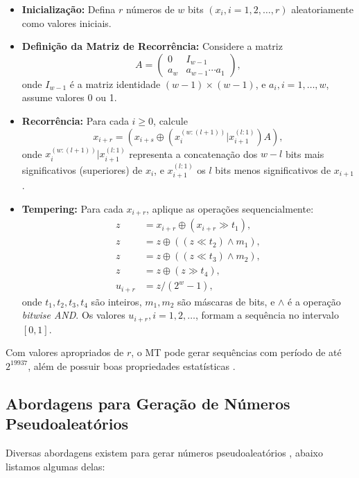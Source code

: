 \begin{itemize}
    \item \textbf{Inicialização:} Defina $r$ números de $w$ bits $(x_i, i = 1, 2, \ldots, r)$ aleatoriamente como valores iniciais.
    \item \textbf{Definição da Matriz de Recorrência:} Considere a matriz
    \[
    A = \begin{pmatrix}
    0 & I_{w-1} \\
    a_w & a_{w-1} \cdots a_1
    \end{pmatrix},
    \]
    onde $I_{w-1}$ é a matriz identidade $(w-1) \times (w-1)$, e $a_i, i = 1, \ldots, w$, assume valores 0 ou 1.
    \item \textbf{Recorrência:} Para cada $i \geq 0$, calcule
    \[
    x_{i+r} = (x_{i+s} \oplus (x_i^{(w:(l+1))} | x_{i+1}^{(l:1)}) A),
    \]
    onde $x_i^{(w:(l+1))}| x_{i+1}^{(l:1)}$ representa a concatenação dos $w-l$ bits mais significativos (superiores)
    de $x_i$, e $x_{i+1}^{(l:1)}$ os $l$ bits menos significativos de $x_{i+1}$.
    \item \textbf{Tempering:} Para cada $x_{i+r}$, aplique as operações sequencialmente:
    \[
    \begin{aligned}
    z &= x_{i+r} \oplus (x_{i+r} \gg t_1), \\
    z &= z \oplus ((z \ll t_2) \land m_1), \\
    z &= z \oplus ((z \ll t_3) \land m_2), \\
    z &= z \oplus (z \gg t_4), \\
    u_{i+r} &= z / (2^w - 1),
    \end{aligned}
    \]
    onde $t_1, t_2, t_3, t_4$ são inteiros, $m_1, m_2$ são máscaras de bits, 
    e $\land$ é a operação \textit{bitwise AND}. Os valores $u_{i+r}, i = 1, 2, \ldots$, 
    formam a sequência no intervalo $[0, 1]$.
\end{itemize}

Com valores apropriados de $r$, o MT pode gerar sequências com período de até
$2^{19937}$, além de possuir boas propriedades
estatísticas \parencite{matsumoto1998mersenne}.






\subsection{Abordagens para Geração de Números Pseudoaleatórios}

Diversas abordagens existem para gerar números pseudoaleatórios
\parencite{knuth1997art,matsumoto1998mersenne,wolfram2002,kocarev2011chaos,kneusel2018random},
abaixo listamos algumas delas:

